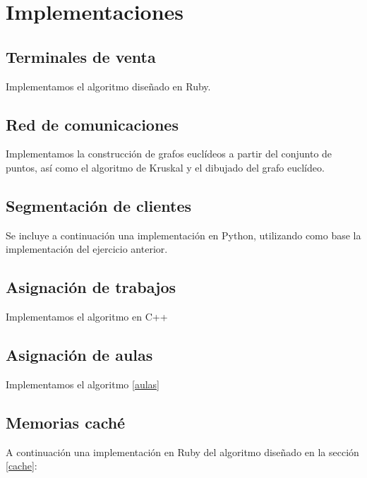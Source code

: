 \documentclass[a4paper, 11pt]{article} %
\begin{document}
  
\section{Implementaciones}
   \subsection{Terminales de venta}
      Implementamos el algoritmo diseñado en Ruby.
  
      \small
	\texttt{}
      \normalsize
   
   \subsection{Red de comunicaciones}
      Implementamos la construcción de grafos euclídeos a partir del conjunto de puntos, así como el algoritmo de Kruskal y
      el dibujado del grafo euclídeo.
      
      \small
	\texttt{}
      \normalsize
    
   \subsection{Segmentación de clientes}
      Se incluye a continuación una implementación en Python, utilizando como base la implementación del ejercicio anterior.\\
        \small
	\texttt{}
	\normalsize
	
	\subsection{Asignación de trabajos}
	Implementamos el algoritmo en C++
	
	\small
	\texttt{}
	\normalsize
	
	\subsection{Asignación de aulas}
	Implementamos el algoritmo \ref{aulas}
	
	\small
	\texttt{}
	\normalsize
	
	\subsection{Memorias caché}
	A continuación una implementación en Ruby del algoritmo diseñado en la sección \ref{cache}:
	
	\small
	\texttt{}
	\normalsize
    
\end{document}
